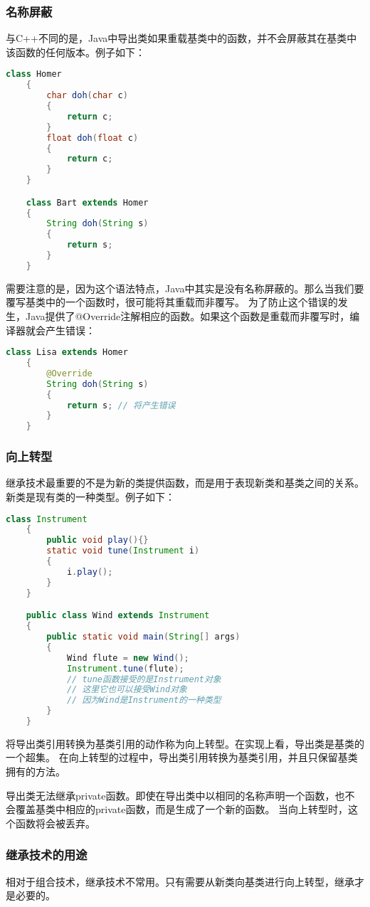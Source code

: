 \documentclass[a4paper,left=2.5cm,right=2.5cm,11pt]{article}
\begin{document}
\subsubsection{名称屏蔽}
	与C++不同的是，Java中导出类如果重载基类中的函数，并不会屏蔽其在基类中该函数的任何版本。例子如下：
	\begin{lstlisting}[language = Java]
	class Homer
	{
		char doh(char c)
		{
			return c;
		}
		float doh(float c)
		{
			return c;
		}
	}

	class Bart extends Homer
	{
		String doh(String s)
		{
			return s;
		}
	}
	\end{lstlisting}

	需要注意的是，因为这个语法特点，Java中其实是没有名称屏蔽的。那么当我们要覆写基类中的一个函数时，很可能将其重载而非覆写。
	为了防止这个错误的发生，Java提供了@Override注解相应的函数。如果这个函数是重载而非覆写时，编译器就会产生错误：
	\begin{lstlisting}[language = Java]
	class Lisa extends Homer
	{
		@Override
		String doh(String s)
		{
			return s; // 将产生错误
		}
	}
	\end{lstlisting}

\subsubsection{向上转型}
	继承技术最重要的不是为新的类提供函数，而是用于表现新类和基类之间的关系。新类是现有类的一种类型。例子如下：
	\begin{lstlisting}[language = Java]
	class Instrument
	{
		public void play(){}
		static void tune(Instrument i)
		{
			i.play();
		}
	}

	public class Wind extends Instrument
	{
		public static void main(String[] args)
		{
			Wind flute = new Wind();
			Instrument.tune(flute);
			// tune函数接受的是Instrument对象
			// 这里它也可以接受Wind对象
			// 因为Wind是Instrument的一种类型
		}
	}
	\end{lstlisting}

	将导出类引用转换为基类引用的动作称为向上转型。在实现上看，导出类是基类的一个超集。
	在向上转型的过程中，导出类引用转换为基类引用，并且只保留基类拥有的方法。\par
	导出类无法继承private函数。即使在导出类中以相同的名称声明一个函数，也不会覆盖基类中相应的private函数，而是生成了一个新的函数。
	当向上转型时，这个函数将会被丢弃。

\subsubsection{继承技术的用途}
	相对于组合技术，继承技术不常用。只有需要从新类向基类进行向上转型，继承才是必要的。
\end{document}
